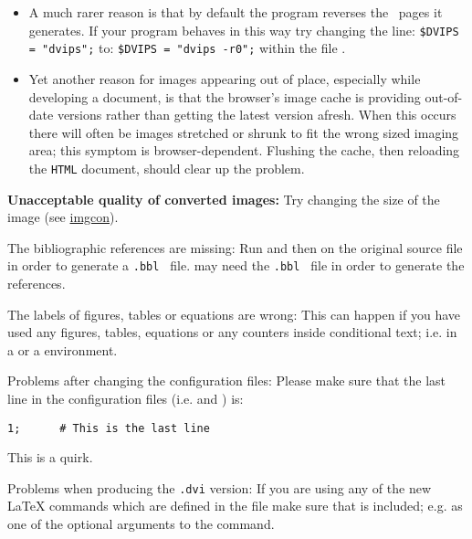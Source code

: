 \begin{htmllist}
\begin{itemize}
\item
A much rarer reason is that by default the  program
reverses the \PS\ pages it generates. If your  program
behaves in this way try changing the line: \html{\\}
\verb|$DVIPS = "dvips";| \html{\\}
to: \html{\\}
\verb|$DVIPS = "dvips -r0";| \html{\\}
within the file .

\item
Yet another reason for images appearing out of place, especially while
developing a document, is that the browser's image cache is providing
out-of-date versions rather than getting the latest version afresh.
When this occurs there will often be images stretched or shrunk
to fit the wrong sized imaging area; this symptom is browser-dependent.
Flushing the cache, then reloading the \texttt{HTML} document, should
clear up the problem.
\end{itemize}


\item [\textbf{Unacceptable quality of converted images: }]
Try changing the size of the image
(see \hyperref{image conversion}{Section~}{}{imgcon}).

\item [The bibliographic references are missing: ]
Run  and then  on the original source file in
order to generate a \texttt{.bbl } file.
\latextohtml{} may need the \texttt{.bbl } file in order to generate
the references.


\item [The labels of figures, tables or equations are wrong: ]
This can happen if you have used any figures, tables, equations or
any counters inside conditional text; i.e. in a 
or a  environment.


\item [Problems after changing the configuration files: ]
Please make sure that the last line in the configuration files
(i.e.  and ) is:
\begin{small}
\begin{verbatim}
1;      # This is the last line
\end{verbatim}
\end{small}
This is a \Perl{} quirk.

\item [Problems when producing the \texttt{.dvi} version: \label{htmlsty}]
If you are using any of the new \LaTeX{} commands which are defined in
the  file make sure that  is included;
e.g. as one of the optional arguments to the  command.


\end{htmllist}
